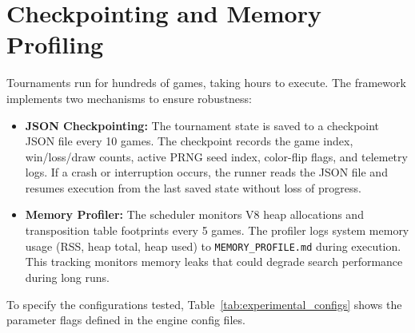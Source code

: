 \section{Checkpointing and Memory Profiling}
Tournaments run for hundreds of games, taking hours to execute. The framework implements two mechanisms to ensure robustness:
\begin{itemize}
    \item \textbf{JSON Checkpointing:} The tournament state is saved to a checkpoint JSON file every 10 games. The checkpoint records the game index, win/loss/draw counts, active PRNG seed index, color-flip flags, and telemetry logs. If a crash or interruption occurs, the runner reads the JSON file and resumes execution from the last saved state without loss of progress.
    \item \textbf{Memory Profiler:} The scheduler monitors V8 heap allocations and transposition table footprints every 5 games. The profiler logs system memory usage (RSS, heap total, heap used) to \texttt{MEMORY\_PROFILE.md} during execution. This tracking monitors memory leaks that could degrade search performance during long runs.
\end{itemize}

To specify the configurations tested, Table~\ref{tab:experimental_configs} shows the parameter flags defined in the engine config files.


